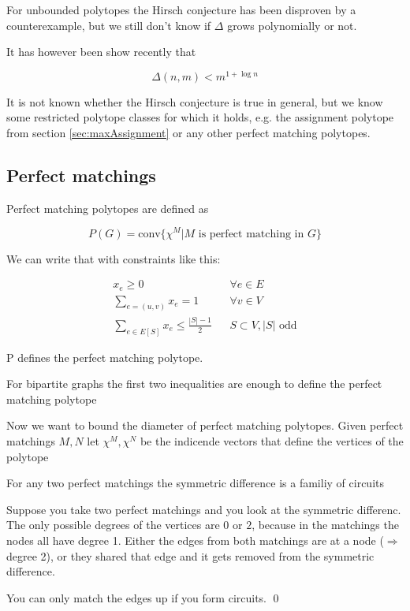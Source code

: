 For unbounded polytopes the Hirsch conjecture has been disproven by a counterexample, but we still don't know if $\Delta$ grows polynomially or not.

It has however been show recently that 

\[\Delta(n,m)<m^{1+\log n}\]

It is not known whether the Hirsch conjecture is true in general, but we know some restricted polytope classes for which it holds, e.g. the assignment polytope from section \ref{sec:maxAssignment} or any other perfect matching polytopes.

\subsection{Perfect matchings}

Perfect matching polytopes are defined as

\[P(G) = \text{conv} \{\chi^M |M \text{ is perfect matching in }G\}\]

We can write that with constraints like this:

\begin{align*}
x_e \geq 0 &&\forall e\in E\\
\sum_{e=(u,v)} x_e = 1 &&\forall v\in V\\
\sum_{e\in E[S]} x_e \leq \frac{|S|-1}{2} &&S\subset V, |S| \text{ odd}
\end{align*}

\begin{thm} P defines the perfect matching polytope.\end{thm}
\begin{thm} For bipartite graphs the first two inequalities are enough to define the perfect matching polytope\end{thm}

Now we want to bound the diameter of perfect matching polytopes. Given perfect matchings $M,N$ let $\chi^M,\chi^N$ be the indicende vectors that define the vertices of the polytope

\begin{lem} For any two perfect matchings the symmetric difference is a familiy of circuits \end{lem}

\begin{pr} Suppose you take two perfect matchings and you look at the symmetric differenc. The only possible degrees of the vertices are $0$ or $2$, because in the matchings the nodes all have degree 1. Either the edges from both matchings are at a node ($\Rightarrow$ degree 2), or they shared that edge and it gets removed from the symmetric difference. 

You can only match the edges up if you form circuits.
\qed \end{pr}

